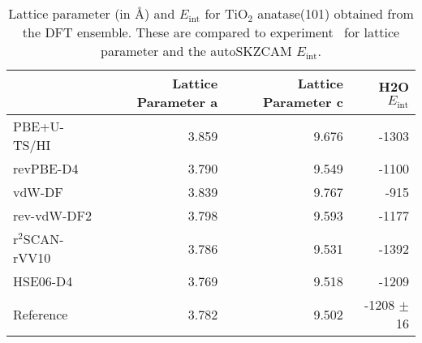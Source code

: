 \begin{table}
\caption{\label{tab:lattice_parametersa-tio2}Lattice parameter (in \AA{}) and  $E_\textrm{int}$ for TiO$_2$ anatase(101) obtained from the DFT ensemble. These are compared to experiment~\cite{burdettStructuralelectronicRelationshipsInorganic1987} for lattice parameter and the autoSKZCAM $E_\textrm{int}$.}
\begin{tabular}{lrrr}
\toprule
 & Lattice Parameter a & Lattice Parameter c & H2O $E_\textrm{int}$ \\ 
\midrule
PBE+U-TS/HI & 3.859 & 9.676 & -1303 \\
revPBE-D4 & 3.790 & 9.549 & -1100 \\
vdW-DF & 3.839 & 9.767 & -915 \\
rev-vdW-DF2 & 3.798 & 9.593 & -1177 \\
r$^2$SCAN-rVV10 & 3.786 & 9.531 & -1392 \\
HSE06-D4 & 3.769 & 9.518 & -1209 \\
Reference & 3.782 & 9.502 & -1208 $\pm$ 16 \\
\bottomrule
\end{tabular}
\end{table}